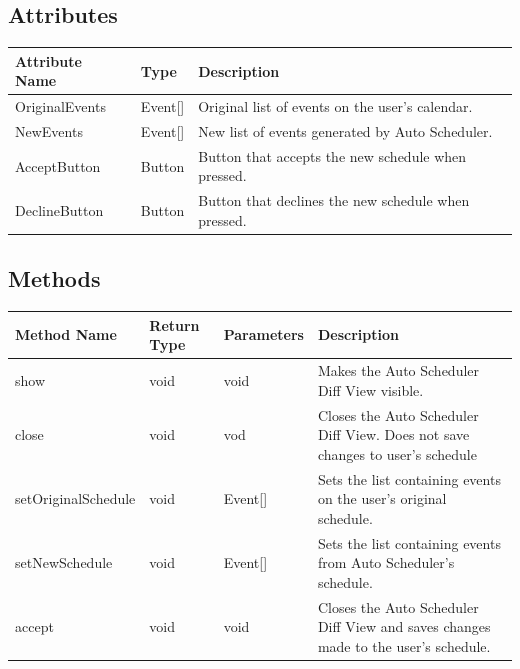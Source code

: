\documentclass{scrreprt}
\begin{document}
\subsection{Attributes}
\begin{center}
\begin{longtable}{ | p{3cm} | p{3cm} | p{9cm} | }
\hline
\textbf{Attribute Name} & \textbf{Type} & \textbf{Description} \\
\hline
OriginalEvents & Event[] & Original list of events on the user's calendar.\\
\hline
NewEvents & Event[] & New list of events generated by Auto Scheduler.\\
\hline
AcceptButton & Button & Button that accepts the new schedule when pressed.\\
\hline
DeclineButton & Button & Button that declines the new schedule when pressed.\\
\hline
\end{longtable}
\end{center}

\subsection{Methods}
\begin{center}
\begin{longtable}{ | p{3cm} | p{2cm} | p{2cm} | p{9cm} | }
\hline
\textbf{Method Name} & \textbf{Return Type} & \textbf{Parameters} & \textbf{Description} \\
\hline
show & void & void & Makes the Auto Scheduler Diff View visible.\\
\hline
close & void & vod & Closes the Auto Scheduler Diff View. Does not save changes to user's schedule\\
\hline
setOriginalSchedule & void & Event[] & Sets the list containing events on the user's original schedule.\\
\hline
setNewSchedule & void & Event[] & Sets the list containing events from Auto Scheduler's schedule.\\
\hline
accept & void & void & Closes the Auto Scheduler Diff View and saves changes made to the user's schedule.\\
\hline
\end{longtable}
\end{center}
\end{document}
